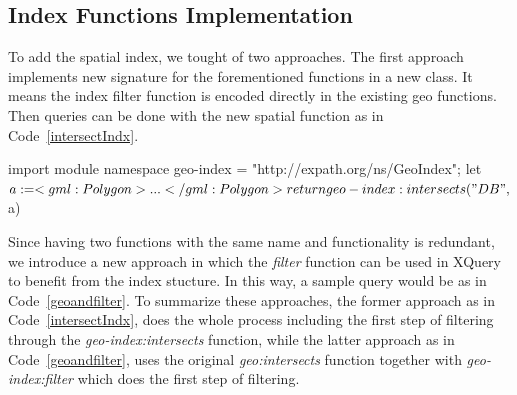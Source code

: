 \documentclass[a4paper,12pt]{article}
\begin{document}
\subsection{Index Functions Implementation}
\label{indexFunc}
To add the spatial index, we tought of two approaches. The first approach implements new signature for the forementioned functions in a new class. It means the index filter function is encoded directly in the existing geo functions. Then queries can be done with the new spatial function as in Code~\ref{intersectIndx}.
\vspace{10px}
\begin{fakeXML}[label=intersectIndx,caption=The geo function containing the index functions]
import module namespace geo-index = "http://expath.org/ns/GeoIndex";
let $a:= <gml:Polygon> ... </gml:Polygon>
return geo-index:intersects("DB", $a) 
\end{fakeXML}

\vspace{10px}
\vspace{10px}

Since having two functions with the same name and functionality is redundant, we introduce a new approach in which the \textit{filter} function can be used in XQuery to benefit from the index stucture. In this way, a sample query would be as in Code~\ref{geoandfilter}. To summarize these approaches, the former approach as in Code~\ref{intersectIndx}, does the whole process including the first step of filtering through the \textit{geo-index:intersects} function, while the latter approach as in Code~\ref{geoandfilter}, uses the original \textit{geo:intersects} function together with \textit{geo-index:filter} which does the first step of filtering. 
\end{document}
